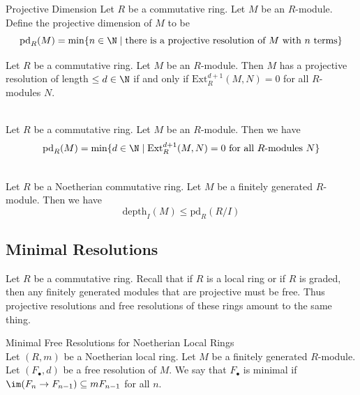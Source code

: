 \documentclass[a4paper]{article}
\begin{document}
\begin{defn}{Projective Dimension}{} Let $R$ be a commutative ring. Let $M$ be an $R$-module. Define the projective dimension of $M$ to be $$\text{pd}_R(M)=\min\{n\in\N\;|\;\text{there is a projective resolution of }M\text{ with }n\text{ terms}\}$$
\end{defn}

\begin{prp}{}{} Let $R$ be a commutative ring. Let $M$ be an $R$-module. Then $M$ has a projective resolution of length $\leq d\in\N$ if and only if $\text{Ext}_R^{d+1}(M,N)=0$ for all $R$-modules $N$. 
\end{prp}

\begin{crl}{}{}\\
Let $R$ be a commutative ring. Let $M$ be an $R$-module. Then we have $$\text{pd}_R(M)=\min\{d\in\N\;|\;\text{Ext}_R^{d+1}(M,N)=0\text{ for all }R\text{-modules }N\}$$
\end{crl}

\begin{crl}{}{}\\
Let $R$ be a Noetherian commutative ring. Let $M$ be a finitely generated $R$-module. Then we have $$\text{depth}_I(M)\leq\text{pd}_R(R/I)$$
\end{crl}

\subsection{Minimal Resolutions}
Let $R$ be a commutative ring. Recall that if $R$ is a local ring or if $R$ is graded, then any finitely generated modules that are projective must be free. Thus projective resolutions and free resolutions of these rings amount to the same thing. 

\begin{defn}{Minimal Free Resolutions for Noetherian Local Rings}{}\\
Let $(R,m)$ be a Noetherian local ring. Let $M$ be a finitely generated $R$-module. Let $(F_\bullet,d)$ be a free resolution of $M$. We say that $F_\bullet$ is minimal if $\im(F_n\to F_{n-1})\subseteq mF_{n-1}$ for all $n$. 
\end{defn}
\end{document}
